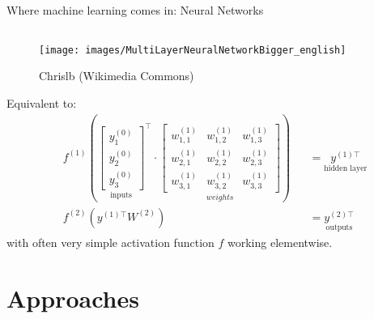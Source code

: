 \documentclass{beamer}
\begin{document}
\begin{frame}{Where machine learning comes in: Neural Networks}
	\begin{figure}
		\begin{columns}
			\begin{column}{.6\linewidth}
				\centering
				\texttt{[image: images/MultiLayerNeuralNetworkBigger\_english]}
			\end{column}
			\begin{column}{.2\linewidth}
				\caption{Chrislb (Wikimedia Commons)}
			\end{column}
		\end{columns}
	\end{figure}
	\vspace{-10pt}
	Equivalent to:
	\begin{align}
		&f^{(1)} \left(
		\underset{\text{inputs}}{
		\begin{bmatrix}
		y^{(0)}_1 \\ y^{(0)}_2 \\ y^{(0)}_3
		\end{bmatrix}}^\top \cdot
		\underset{weights}{\begin{bmatrix}
		w^{(1)}_{1,1} & w^{(1)}_{1,2} & w^{(1)}_{1,3} \\
		w^{(1)}_{2,1} & w^{(1)}_{2,2} & w^{(1)}_{2,3} \\
		w^{(1)}_{3,1} & w^{(1)}_{3,2} & w^{(1)}_{3,3}
		\end{bmatrix}}
		\right) &&= 
		\underset{\text{hidden layer}}{y^{(1)\top}}
		\\
		&f^{(2)} \left( y^{(1)\top}W^{(2)} \right) &&= 
		\underset{\text{outputs}}{y^{(2)\top}}
	\end{align}
	with often very simple \alert{activation function $f$} working elementwise.
\end{frame}

\section{Approaches}
\end{document}
